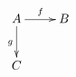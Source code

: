 \documentclass{article}
\begin{document}
\[
  \xymatrix{A \ar[r]^{f} \ar[d]_{g} & B \\ C}
\]
\end{document}
